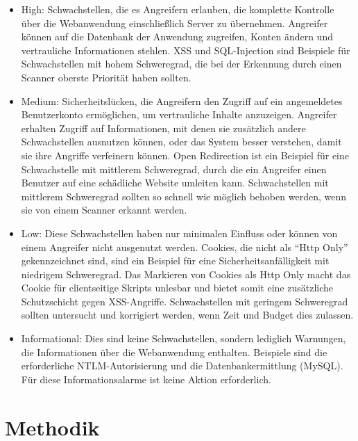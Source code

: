 \documentclass[12pt,oneside,a4paper,parskip]{scrbook}
\begin{document}
\begin{itemize}
    \begin{itemize}
      \item High: Schwachstellen, die es Angreifern erlauben, die komplette Kontrolle über die Webanwendung einschließlich Server zu übernehmen. Angreifer können auf die Datenbank der Anwendung zugreifen, Konten ändern und vertrauliche Informationen stehlen. XSS und SQL-Injection sind Beispiele für Schwachstellen mit hohem Schweregrad, die bei der Erkennung durch einen Scanner oberste Priorität haben sollten.

      \item Medium: Sicherheitslücken, die Angreifern den Zugriff auf ein angemeldetes Benutzerkonto ermöglichen, um vertrauliche Inhalte anzuzeigen. Angreifer erhalten Zugriff auf Informationen, mit denen sie zusätzlich andere Schwachstellen ausnutzen können, oder das System besser verstehen, damit sie ihre Angriffe verfeinern können. Open Redirection ist ein Beispiel für eine Schwachstelle mit mittlerem Schweregrad, durch die ein Angreifer einen Benutzer auf eine schädliche Website umleiten kann. Schwachstellen mit mittlerem Schweregrad sollten so schnell wie möglich behoben werden, wenn sie von einem Scanner erkannt werden.

      \item Low: Diese Schwachstellen haben nur minimalen Einfluss oder können von einem Angreifer nicht ausgenutzt werden. Cookies, die nicht als ``Http Only'' gekennzeichnet sind, sind ein Beispiel für eine Sicherheitsanfälligkeit mit niedrigem Schweregrad. Das Markieren von Cookies als Http Only macht das Cookie für clientseitige Skripts unlesbar und bietet somit eine zusätzliche Schutzschicht gegen XSS-Angriffe. Schwachstellen mit geringem Schweregrad sollten untersucht und korrigiert werden, wenn Zeit und Budget dies zulassen.

      \item Informational: Dies sind keine Schwachstellen, sondern lediglich Warnungen, die Informationen über die Webanwendung enthalten. Beispiele sind die erforderliche NTLM-Autorisierung und die Datenbankermittlung (MySQL). Für diese Informationsalarme ist keine Aktion erforderlich.
    \end{itemize}

  \end{itemize}



\chapter{Methodik}
\end{document}
